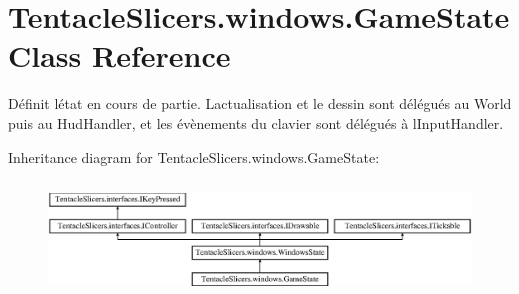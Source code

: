 \hypertarget{class_tentacle_slicers_1_1windows_1_1_game_state}{}\section{Tentacle\+Slicers.\+windows.\+Game\+State Class Reference}
\label{class_tentacle_slicers_1_1windows_1_1_game_state}


Définit l\textquotesingle{}état en cours de partie. L\textquotesingle{}actualisation et le dessin sont délégués au World puis au Hud\+Handler, et les évènements du clavier sont délégués à l\textquotesingle{}Input\+Handler.  


Inheritance diagram for Tentacle\+Slicers.\+windows.\+Game\+State\+:\begin{figure}[H]
\begin{center}
\leavevmode
\includegraphics[height=3.085400cm]{class_tentacle_slicers_1_1windows_1_1_game_state}
\end{center}
\end{figure}
